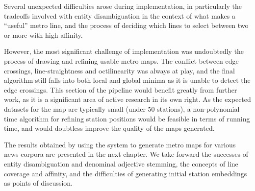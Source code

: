 Several unexpected difficulties arose during implementation, in particularly the tradeoffs involved with entity disambiguation in the context of what makes a ``useful'' metro line, and the process of deciding which lines to select between two or more with high affinity. 

However, the most significant challenge of implementation was undoubtedly the process of drawing and refining usable metro maps. The conflict between edge crossings, line-straightness and octilinearity was always at play, and the final algorithm still falls into both local and global minima as it is unable to detect the edge crossings. This section of the pipeline would benefit greatly from further work, as it is a significant area of active research in its own right. As the expected datasets for the map are typically small (under 50 stations), a non-polynomial time algorithm for refining station positions would be feasible in terms of running time, and would doubtless improve the quality of the maps generated.

The results obtained by using the system to generate metro maps for various news corpora are presented in the next chapter. We take forward the successes of entity disambiguation and denominal adjective stemming, the concepts of line coverage and affinity, and the difficulties of generating initial station embeddings as points of discussion.


